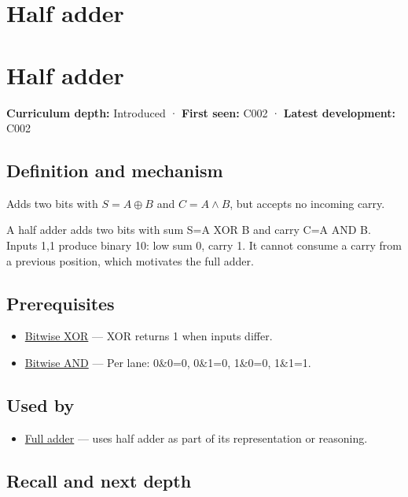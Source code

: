\hypertarget{appendix-1652d27a8e90}{}
\section*{Half adder}
\section{Half adder}\label{half-adder}

\textbf{Curriculum depth:} Introduced · \textbf{First seen:} C002 · \textbf{Latest development:} C002

\subsection{Definition and mechanism}\label{definition-and-mechanism}

Adds two bits with \(S=A\oplus B\) and \(C=A\land B\), but accepts no incoming carry.

A half adder adds two bits with sum S=A XOR B and carry C=A AND B. Inputs 1,1 produce binary 10: low sum 0, carry 1. It cannot consume a carry from a previous position, which motivates the full adder.

\subsection{Prerequisites}\label{prerequisites}

\begin{itemize}
\tightlist
\item
  \hyperref[appendix-d49161831368]{Bitwise XOR} --- XOR returns 1 when inputs differ.
\item
  \hyperref[appendix-68b52453737c]{Bitwise AND} --- Per lane: 0\&0=0, 0\&1=0, 1\&0=0, 1\&1=1.
\end{itemize}

\subsection{Used by}\label{used-by}

\begin{itemize}
\tightlist
\item
  \hyperref[appendix-d1a5b1e520c2]{Full adder} --- uses half adder as part of its representation or reasoning.
\end{itemize}

\subsection{Recall and next depth}\label{recall-and-next-depth}

